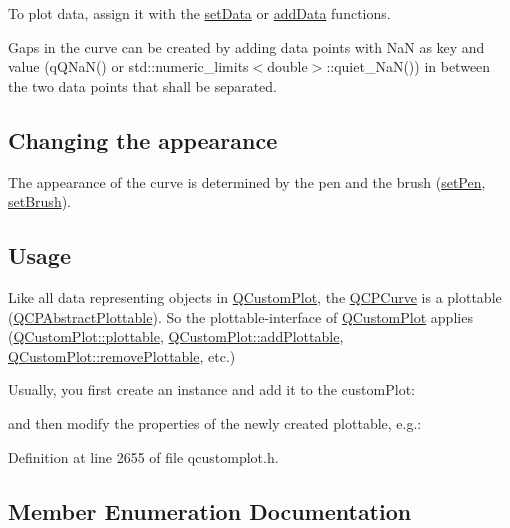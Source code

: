 To plot data, assign it with the \hyperlink{class_q_c_p_curve_a631ac886708460013b30052f49cbc9da}{set\+Data} or \hyperlink{class_q_c_p_curve_a4e24023c3b9ac75440c7a260172c99af}{add\+Data} functions.

Gaps in the curve can be created by adding data points with NaN as key and value ({\ttfamily q\+Q\+Na\+N()} or {\ttfamily std\+::numeric\+\_\+limits$<$double$>$\+::quiet\+\_\+\+Na\+N()}) in between the two data points that shall be separated.\hypertarget{class_q_c_p_statistical_box_appearance}{}\subsection{Changing the appearance}\label{class_q_c_p_statistical_box_appearance}
The appearance of the curve is determined by the pen and the brush (\hyperlink{class_q_c_p_abstract_plottable_ab74b09ae4c0e7e13142fe4b5bf46cac7}{set\+Pen}, \hyperlink{class_q_c_p_abstract_plottable_a7a4b92144dca6453a1f0f210e27edc74}{set\+Brush}). \hypertarget{class_q_c_p_statistical_box_usage}{}\subsection{Usage}\label{class_q_c_p_statistical_box_usage}
Like all data representing objects in \hyperlink{class_q_custom_plot}{Q\+Custom\+Plot}, the \hyperlink{class_q_c_p_curve}{Q\+C\+P\+Curve} is a plottable (\hyperlink{class_q_c_p_abstract_plottable}{Q\+C\+P\+Abstract\+Plottable}). So the plottable-\/interface of \hyperlink{class_q_custom_plot}{Q\+Custom\+Plot} applies (\hyperlink{class_q_custom_plot_a32de81ff53e263e785b83b52ecd99d6f}{Q\+Custom\+Plot\+::plottable}, \hyperlink{class_q_custom_plot_ab7ad9174f701f9c6f64e378df77927a6}{Q\+Custom\+Plot\+::add\+Plottable}, \hyperlink{class_q_custom_plot_af3dafd56884208474f311d6226513ab2}{Q\+Custom\+Plot\+::remove\+Plottable}, etc.)

Usually, you first create an instance and add it to the custom\+Plot\+: 
\begin{DoxyCodeInclude}
\end{DoxyCodeInclude}
and then modify the properties of the newly created plottable, e.\+g.\+: 
\begin{DoxyCodeInclude}
\end{DoxyCodeInclude}


Definition at line 2655 of file qcustomplot.\+h.



\subsection{Member Enumeration Documentation}
\mbox{\label{class_q_c_p_curve_a2710e9f79302152cff794c6e16cc01f1}} 
